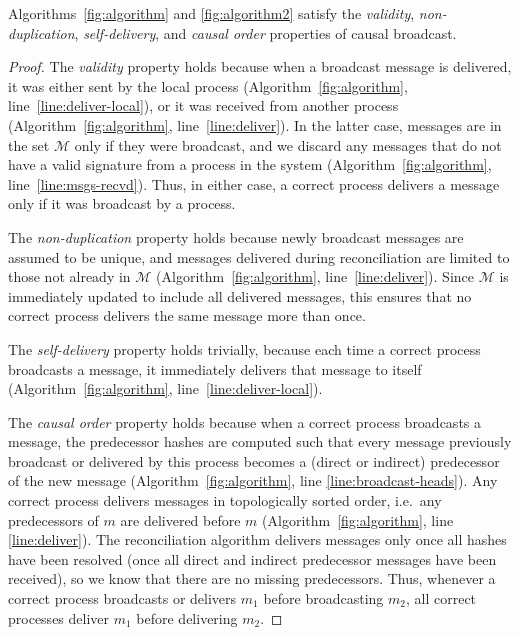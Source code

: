 \documentclass[a4paper,anonymous,USenglish]{lipics-v2019}
\begin{document}
\begin{lemma}\label{lemma:easy-properties}
Algorithms~\ref{fig:algorithm} and \ref{fig:algorithm2} satisfy the \emph{validity}, \emph{non-duplication}, \emph{self-delivery}, and \emph{causal order} properties of causal broadcast.
\end{lemma}
\begin{proof}
The \emph{validity} property holds because when a broadcast message is delivered, it was either sent by the local process (Algorithm~\ref{fig:algorithm}, line~\ref{line:deliver-local}), or it was received from another process (Algorithm~\ref{fig:algorithm}, line~\ref{line:deliver}).
In the latter case, messages are in the set $\mathcal{M}$ only if they were broadcast, and we discard any messages that do not have a valid signature from a process in the system (Algorithm~\ref{fig:algorithm}, line~\ref{line:msgs-recvd}).
Thus, in either case, a correct process delivers a message only if it was broadcast by a process.

The \emph{non-duplication} property holds because newly broadcast messages are assumed to be unique, and messages delivered during reconciliation are limited to those not already in $\mathcal{M}$ (Algorithm~\ref{fig:algorithm}, line~\ref{line:deliver}).
Since $\mathcal{M}$ is immediately updated to include all delivered messages, this ensures that no correct process delivers the same message more than once.

The \emph{self-delivery} property holds trivially, because each time a correct process broadcasts a message, it immediately delivers that message to itself (Algorithm~\ref{fig:algorithm}, line~\ref{line:deliver-local}).

The \emph{causal order} property holds because when a correct process broadcasts a message, the predecessor hashes are computed such that every message previously broadcast or delivered by this process becomes a (direct or indirect) predecessor of the new message (Algorithm~\ref{fig:algorithm}, line \ref{line:broadcast-heads}).
Any correct process delivers messages in topologically sorted order, i.e.\ any predecessors of $m$ are delivered before $m$ (Algorithm~\ref{fig:algorithm}, line \ref{line:deliver}).
The reconciliation algorithm delivers messages only once all hashes have been resolved (once all direct and indirect predecessor messages have been received), so we know that there are no missing predecessors.
Thus, whenever a correct process broadcasts or delivers $m_1$ before broadcasting $m_2$, all correct processes deliver $m_1$ before delivering $m_2$.
\end{proof}
\end{document}
